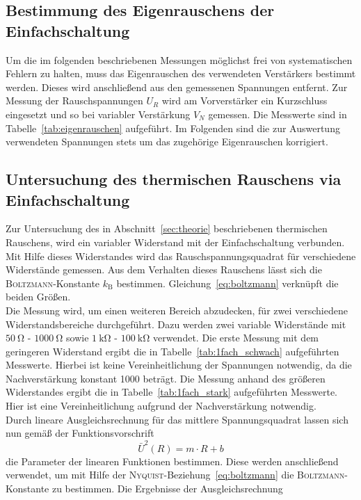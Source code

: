 \subsection{Bestimmung des Eigenrauschens der Einfachschaltung}
%
Um die im folgenden beschriebenen Messungen möglichst frei von systematischen
Fehlern zu halten, muss das Eigenrauschen des verwendeten Verstärkers bestimmt
werden. Dieses wird anschließend aus den gemessenen Spannungen entfernt. Zur
Messung der Rauschspannungen $U_R$ wird am Vorverstärker ein Kurzschluss
eingesetzt und so bei variabler Verstärkung $V_N$ gemessen. Die Messwerte sind
in Tabelle~\ref{tab:eigenrauschen} aufgeführt. Im Folgenden sind die zur
Auswertung verwendeten Spannungen stets um das zugehörige Eigenrauschen
korrigiert.
%
\subsection{Untersuchung des thermischen Rauschens via Einfachschaltung}
%
Zur Untersuchung des in Abschnitt~\ref{sec:theorie} beschriebenen thermischen
Rauschens, wird ein variabler Widerstand mit der Einfachschaltung verbunden. Mit
Hilfe dieses Widerstandes wird das Rauschspannungsquadrat für verschiedene
Widerstände gemessen. Aus dem Verhalten dieses Rauschens lässt sich die
\textsc{Boltzmann}-Konstante $k_\text{B}$ bestimmen. Gleichung~\eqref{eq:boltzmann} verknüpft die beiden Größen. \\
Die Messung wird, um einen weiteren Bereich abzudecken, für zwei verschiedene
Widerstandsbereiche durchgeführt. Dazu werden zwei variable Widerstände mit
$\SI{50}{\ohm}$ - $\SI{1000}{\ohm}$ sowie $\SI{1}{\kilo\ohm}$ -
$\SI{100}{\kilo\ohm}$ verwendet. Die erste Messung mit dem geringeren Widerstand
ergibt die in Tabelle~\ref{tab:1fach_schwach} aufgeführten Messwerte. Hierbei
ist keine Vereinheitlichung der Spannungen notwendig, da die Nachverstärkung
konstant \num{1000} beträgt. Die Messung anhand des größeren Widerstandes ergibt
die in Tabelle~\ref{tab:1fach_stark} aufgeführten Messwerte. Hier ist eine
Vereinheitlichung aufgrund der Nachverstärkung notwendig. \\
Durch lineare Ausgleichsrechnung für das mittlere Spannungsquadrat lassen sich
nun gemäß der Funktionsvorschrift
%
\begin{equation}
  \bar{U}^2(R)=m\cdot R + b
\end{equation}
%
die Parameter der linearen Funktionen bestimmen. Diese werden anschließend
verwendet, um mit Hilfe der \textsc{Nyquist}-Beziehung~\eqref{eq:boltzmann} die
\textsc{Boltzmann}-Konstante zu bestimmen. Die Ergebnisse der Ausgleichsrechnung
